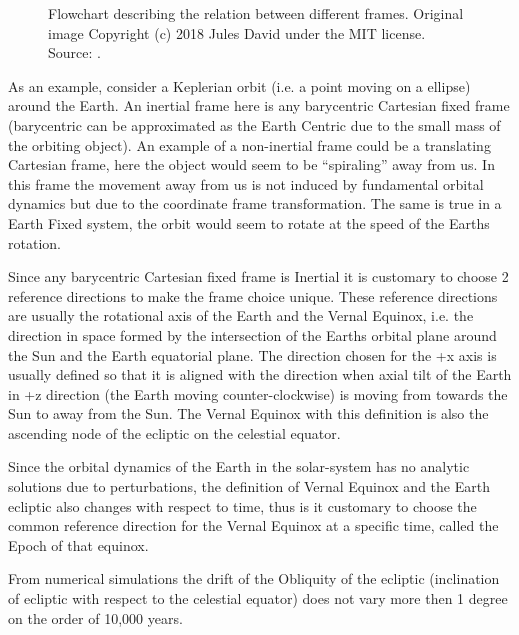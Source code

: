 \documentclass[letterpaper,10pt,english]{sphinxmanual}
\begin{document}
\begin{figure}[htbp]
\centering
\capstart

\noindent{}
\caption{Flowchart describing the relation between different frames. Original image Copyright (c) 2018 Jules David under the MIT license. Source: .}\label{\detokenize{introduction/conventions:id1}}\end{figure}

As an example, consider a Keplerian orbit (i.e. a point moving on a ellipse) around the Earth. An inertial frame here is any barycentric Cartesian fixed frame (barycentric can be approximated as the Earth Centric due to the small mass of the orbiting object). An example of a non-inertial frame could be a translating Cartesian frame, here the object would seem to be “spiraling” away from us. In this frame the movement away from us is not induced by fundamental orbital dynamics but due to the coordinate frame transformation. The same is true in a Earth Fixed system, the orbit would seem to rotate at the speed of the Earths rotation.

Since any barycentric Cartesian fixed frame is Inertial it is customary to choose 2 reference directions to make the frame choice unique. These reference directions are usually the rotational axis of the Earth and the Vernal Equinox, i.e. the direction in space formed by the intersection of the Earths orbital plane around the Sun and the Earth equatorial plane. The direction chosen for the +x axis is usually defined so that it is aligned with the direction when axial tilt of the Earth in +z direction (the Earth moving counter-clockwise) is moving from towards the Sun to away from the Sun. The Vernal Equinox with this definition is also the ascending node of the ecliptic on the celestial equator.

Since the orbital dynamics of the Earth in the solar-system has no analytic solutions due to perturbations, the definition of Vernal Equinox and the Earth ecliptic also changes with respect to time, thus is it customary to choose the common reference direction for the Vernal Equinox at a specific time, called the Epoch of that equinox.

From numerical simulations the drift of the Obliquity of the ecliptic (inclination of ecliptic with respect to the celestial equator) does not vary more then 1 degree on the order of 10,000 years.
\end{document}
